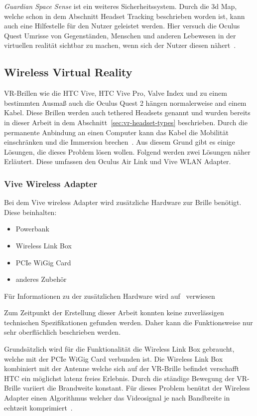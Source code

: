 \emph{Guardian Space Sense} ist ein weiteres Sicherheitssystem.
Durch die 3d Map, welche schon in dem Abschnitt Headset Tracking beschrieben worden ist, kann auch eine Hilfestelle für den Nutzer geleistet werden.
Hier versuch die Oculus Quest Umrisse von Gegenständen, Menschen und anderen Lebewesen in der virtuellen realität sichtbar zu machen, wenn sich der Nutzer diesen nähert~\cite{Oculus_Guardien}.

\subsection{Wireless Virtual Reality}
\label{subsec:wireless-virtual-reality}

VR-Brillen wie die HTC Vive, HTC Vive Pro, Valve Index und zu einem bestimmten Ausmaß auch die Oculus Quest 2 hängen normalerweise and einem Kabel.
Diese Brillen werden auch tethered Headsets genannt und wurden bereits in dieser Arbeit in dem Abschnitt~\ref{sec:vr-headset-types} beschrieben.
Durch die permanente Anbindung an einen Computer kann das Kabel die Mobilität einschränken und die Immersion brechen~\cite{Oculus_2021}.
Aus diesem Grund gibt es einige Lösungen, die dieses Problem lösen wollen.
Folgend werden zwei Lösungen näher Erläutert.
Diese umfassen den Oculus Air Link und Vive WLAN Adapter.

\subsubsection{Vive Wireless Adapter}

Bei dem Vive wireless Adapter wird zusätzliche Hardware zur Brille benötigt.
Diese beinhalten:

\begin{itemize}
    \item Powerbank
    \item Wireless Link Box
    \item PCIe WiGig Card
    \item anderes Zubehör
\end{itemize}

Für Informationen zu der zusätzlichen Hardware wird auf~\cite{ViveWirelessAdapter} verwiesen

Zum Zeitpunkt der Erstellung dieser Arbeit konnten keine zuverlässigen technischen Spezifikationen gefunden werden.
Daher kann die Funktionsweise nur sehr oberflächlich beschrieben werden.

Grundsätzlich wird für die Funktionalität die Wireless Link Box gebraucht, welche mit der PCIe WiGig Card verbunden ist.
Die Wireless Link Box kombiniert mit der Antenne welche sich auf der VR-Brille befindet verschafft HTC ein möglichst latenz freies Erlebnis.
Durch die ständige Bewegung der VR-Brille variiert die Brandweite konstant.
Für dieses Problem benützt der Wireless Adapter einen Algorithmus welcher das Videosignal je nach Bandbreite in echtzeit komprimiert~\cite{VRConduit_2018}.

